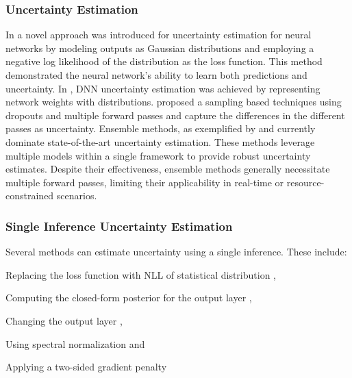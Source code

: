 \documentclass[letterpaper, 10 pt, conference]{ieeeconf}  %
\begin{document}
\subsubsection*{{\textbf{Uncertainty Estimation}}}
In \cite{nix1994estimating} a novel approach was introduced for uncertainty estimation for neural networks by modeling outputs as Gaussian distributions and employing a negative log likelihood of the distribution as the loss function. This  method demonstrated the neural network's ability to learn both predictions and uncertainty. In \cite{blundell2015weight}, DNN uncertainty estimation was achieved by representing network weights with distributions. \cite{gal_dropout_2016} proposed a sampling based techniques using dropouts and multiple forward passes and capture the differences in the different passes as uncertainty.
Ensemble methods, as exemplified by \cite{lakshminarayanan_simple_2016, dusenberry2020efficient} and \cite{wen2020batchensemble} currently dominate state-of-the-art uncertainty estimation. These methods leverage multiple models within a single framework to provide robust uncertainty estimates. Despite their effectiveness, ensemble methods generally necessitate multiple forward passes, limiting their applicability in real-time or resource-constrained scenarios.
\subsubsection*{{\textbf{Single Inference Uncertainty Estimation}}}
Several methods can estimate uncertainty using a single inference. These include:
\begin{inparaenum}
    \item Replacing the loss function with NLL of statistical distribution \cite{malinin_regression_2020, sensoy_evidential_2018, amini_deep_2019, nair_laplace_2O22},
    \item Computing the closed-form posterior for the output layer \cite{Riquelme2018Deep, SnoekRSKSSPPA15},
    \item Changing the output layer \cite{calandra2016manifold, tagasovska2019single}, 
    \item Using spectral normalization \cite{LiuLPTBL20} and
    \item Applying a two-sided gradient penalty  \cite{van2020uncertainty}
\end{inparaenum}
\end{document}
